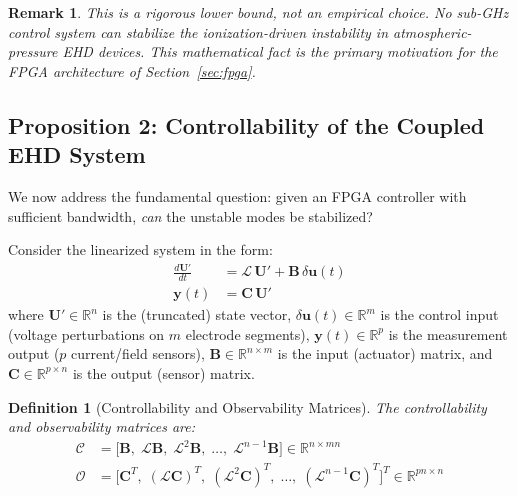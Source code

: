 \documentclass[12pt,twocolumn]{article}
\newtheorem{definition}{Definition}
\newtheorem{remark}{Remark}
\newcommand{\uu}{\mathbf{U}}
\newcommand{\Lop}{\mathcal{L}}
\begin{document}
\begin{remark}
This is a rigorous lower bound, not an empirical choice. No
sub-GHz control system can stabilize the ionization-driven instability
in atmospheric-pressure EHD devices. This mathematical fact is the
primary motivation for the FPGA architecture of
Section~\ref{sec:fpga}.
\end{remark}

\subsection{Proposition 2: Controllability of the Coupled EHD System}
\label{sec:stability:control}

We now address the fundamental question: given an FPGA controller
with sufficient bandwidth, \emph{can} the unstable modes be stabilized?

Consider the linearized system in the form:
\begin{align}
  \frac{d\uu'}{dt} &= \Lop\,\uu' + \mathbf{B}\,\delta\bm{u}(t)
  \label{eq:state_eq} \\
  \bm{y}(t) &= \mathbf{C}\,\uu'
  \label{eq:output_eq}
\end{align}
where $\uu' \in \mathbb{R}^n$ is the (truncated) state vector,
$\delta\bm{u}(t) \in \mathbb{R}^m$ is the control input
(voltage perturbations on $m$ electrode segments),
$\bm{y}(t) \in \mathbb{R}^p$ is the measurement output
($p$ current/field sensors), $\mathbf{B} \in \mathbb{R}^{n \times m}$
is the input (actuator) matrix, and
$\mathbf{C} \in \mathbb{R}^{p \times n}$ is the output (sensor)
matrix.

\begin{definition}[Controllability and Observability Matrices]
\label{def:kalman}
The controllability and observability matrices are:
\begin{align}
  \mathcal{C} &= \bigl[\mathbf{B},\; \Lop\mathbf{B},\;
    \Lop^2\mathbf{B},\; \ldots,\; \Lop^{n-1}\mathbf{B}\bigr]
    \in \mathbb{R}^{n \times mn}
    \label{eq:controllability_matrix} \\
  \mathcal{O} &= \bigl[\mathbf{C}^T,\;
    (\Lop\mathbf{C})^T,\; (\Lop^2\mathbf{C})^T,\;
    \ldots,\; (\Lop^{n-1}\mathbf{C})^T\bigr]^T
    \in \mathbb{R}^{pn \times n}
    \label{eq:observability_matrix}
\end{align}
\end{definition}
\end{document}
